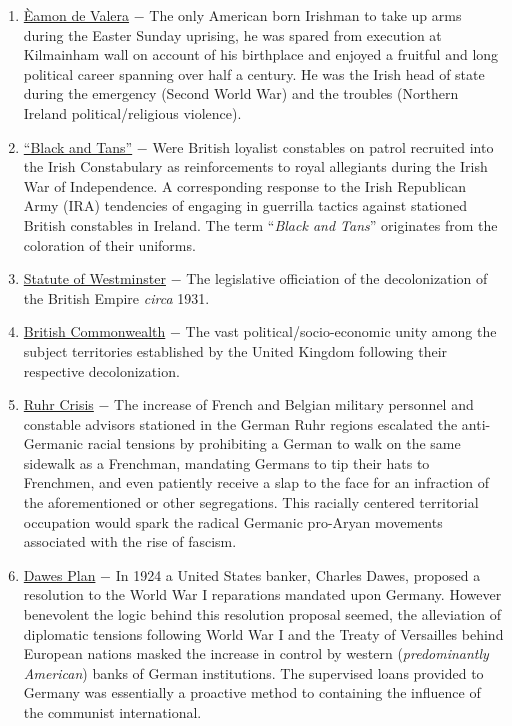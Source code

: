 \documentclass[12pt]{article}
\begin{document}
\begin{flushleft}
\begin{enumerate}
\item \underline{\`Eamon de Valera} $-$ The only American born Irishman to take up arms during the Easter Sunday uprising, he was spared from execution at  Kilmainham wall on account of his birthplace and enjoyed a fruitful and long political career spanning over half a century. He was the Irish head of state during the emergency (Second World War) and the troubles (Northern Ireland political/religious violence).

\item \underline{``Black and Tans''} $-$ Were British loyalist constables on patrol recruited into the Irish Constabulary as reinforcements to royal allegiants during the Irish War of Independence. A corresponding response to the Irish Republican Army (IRA) tendencies of engaging in guerrilla tactics against stationed British constables in Ireland. The term ``\emph{Black and Tans}'' originates from the coloration of their uniforms.

\item \underline{Statute of Westminster} $-$ The legislative officiation of the decolonization of the British Empire \emph{circa} 1931.

\item \underline{British Commonwealth} $-$ The vast political/socio-economic unity among the subject territories established by the United Kingdom following their respective decolonization. 

\item \underline{Ruhr Crisis} $-$ The increase of French and Belgian military personnel and constable advisors stationed in the German Ruhr regions escalated the anti-Germanic racial tensions by prohibiting a German to walk on the same sidewalk as a Frenchman, mandating Germans to tip their hats to Frenchmen, and even patiently receive a slap to the face for an infraction of the aforementioned or other segregations. This racially centered territorial occupation would spark the radical Germanic pro-Aryan movements associated with the rise of fascism.

\item \underline{Dawes Plan} $-$ In 1924 a United States banker, Charles Dawes, proposed a resolution to the World War I reparations mandated upon Germany. However benevolent the logic behind this resolution proposal seemed, the alleviation of diplomatic tensions following World War I and the Treaty of Versailles behind European nations masked the increase in control by western (\emph{predominantly American}) banks of German institutions. The supervised loans provided to Germany was essentially a proactive method to containing the influence of the communist international. 


\end{enumerate}
\end{flushleft}
\end{document}
